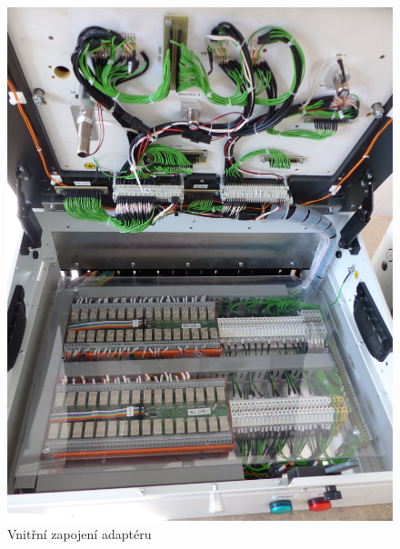 	\begin{figure}[ht!]
		\begin{minipage}{0.49\textwidth}
			\includegraphics[width = \textwidth ,angle = -90]{obrazky/ADAPTER_INSIGHT.jpg}
            \caption{Vnitřní zapojení adaptéru}
			

\end{minipage}
\end{figure}
